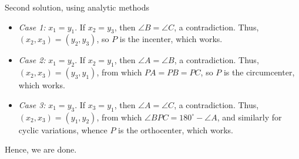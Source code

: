 \begin{customenv}{Second solution, using analytic methods}
\begin{itemize}
        \item \textit{Case 1:} $x_1=y_1$. If $x_2=y_3$, then $\angle B=\angle C$, a contradiction. Thus, $(x_2,x_3)=(y_2,y_3)$, so $P$ is the incenter, which works.
        \item \textit{Case 2:} $x_1=y_2$. If $x_2=y_1$, then $\angle A=\angle B$, a contradiction. Thus, $(x_2,x_3)=(y_3,y_1)$, from which $PA=PB=PC$, so $P$ is the circumcenter, which works.
        \item \textit{Case 3:} $x_1=y_3$. If $x_3=y_1$, then $\angle A=\angle C$, a contradiction. Thus, $(x_2,x_3)=(y_1,y_2)$, from which $\angle BPC=180^\circ-\angle A$, and similarly for cyclic variations, whence $P$ is the orthocenter, which works.
    \end{itemize}
    Hence, we are done. 
\end{customenv}

